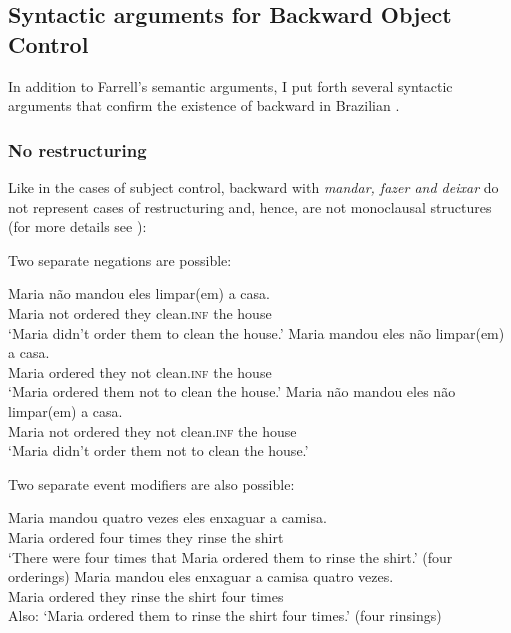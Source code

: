 \documentclass[output=paper]{langsci/langscibook}
\begin{document}
\z

\subsection{Syntactic arguments for Backward Object Control} %

In addition to Farrell’s semantic arguments, I put forth several syntactic arguments that confirm the existence of backward  in Brazilian .

\subsubsection{No restructuring}%

Like in the cases of subject control, backward  with \textit{mandar, fazer and deixar}\textbf{ }do not represent cases of restructuring and, hence, are not monoclausal structures (for more details see \citealt{Cyrino2010}):

Two separate negations are possible:

\ea%
    \label{ex:moreno:14}
    \ea
    \gll Maria não   mandou   eles limpar(em)   a casa.\\
         Maria not   ordered   they clean.\textsc{inf}   the house\\
    \glt ‘Maria didn’t order them to clean the house.’
    \ex  
    \gll Maria mandou   eles não   limpar(em)   a casa.\\
         Maria ordered   they not   clean.\textsc{inf}   the house\\
    \glt ‘Maria ordered them not  to clean  the house.’
    \ex  
    \gll Maria não   mandou   eles não limpar(em)   a casa.\\
         Maria  not   ordered   they not clean.\textsc{inf}   the house\\
    \glt ‘Maria didn’t order them not to clean the house.’
    \z
\z

Two separate event modifiers are also possible:

\ea%
    \label{ex:moreno:15}
    \ea
    \gll Maria mandou   quatro vezes  eles enxaguar   a camisa.\\
         Maria ordered    four    times  they rinse   the shirt\\
    \glt ‘There were four times that Maria ordered them to rinse the shirt.’ (four orderings)
    \ex  
    \gll Maria mandou eles   enxaguar   a camisa   quatro vezes.\\
         Maria ordered they   rinse     the shirt  four times\\
    \glt Also: ‘Maria ordered them to rinse the shirt four times.’ (four rinsings)
    \z
\z
\end{document}
